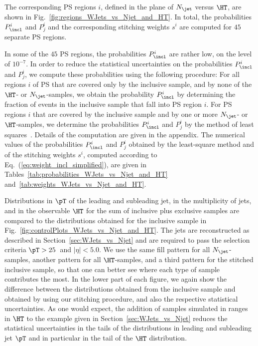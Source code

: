 The corresponding PS regions $i$, defined in the plane of $N_{\jet}$ versus $\HT$, are shown in Fig.~\ref{fig:regions_WJets_vs_Njet_and_HT}.
In total, the probabilities $P_{\incl}^{i}$ and $P_{j}^{i}$ and the corresponding stitching weights $s^{i}$ are computed for $45$ separate PS regions.

In some of the $45$ PS regions, the probabilities $P_{\incl}^{i}$ are rather low, on the level of $10^{-7}$.
In order to reduce the statistical uncertainties on the probabilities $P_{\incl}^{i}$ and $P_{j}^{i}$,
we compute these probabilities using the following procedure:
For all regions $i$ of PS that are covered only by the inclusive sample, and by none of the $\HT$- or $N_{\jet}$-samples,
we obtain the probability $P_{\incl}^{i}$ by determining the fraction of events in the inclusive sample that fall into PS region $i$.
For PS regions $i$ that are covered by the inclusive sample and by one or more $N_{\jet}$- or $\HT$-samples,
we determine the probabilities $P_{\incl}^{i}$ and $P_{j}^{i}$ by the method of least squares~\cite{Cowan:1998ji}.
Details of the computation are given in the appendix.
The numerical values of the probabilities $P_{\incl}^{i}$ and $P_{j}^{i}$ obtained by the least-square method
and of the stitching weights $s^{i}$, computed according to Eq.~(\ref{eq:weight_incl_simplified}), are given in Tables~\ref{tab:probabilities_WJets_vs_Njet_and_HT}
and~\ref{tab:weights_WJets_vs_Njet_and_HT}.

Distributions in $\pT$ of the leading and subleading jet,
in the multiplicity of jets, and in the observable $\HT$ 
for the sum of inclusive plus exclusive samples are compared to the distributions obtained for the inclusive sample in Fig.~\ref{fig:controlPlots_WJets_vs_Njet_and_HT}.
The jets are reconstructed as described in Section~\ref{sec:WJets_vs_Njet} and are required to pass the selection criteria $\pT > 25$~\GeV and $\vert\eta\vert < 5.0$.
We use the same fill pattern for all $N_{\jet}$-samples, another pattern for all $\HT$-samples, and a third pattern for the stitched inclusive sample,
so that one can better see where each type of sample contributes the most.
In the lower part of each figure, we again show the difference between the distributions obtained from the inclusive sample and obtained by using our stitching procedure,
and also the respective statistical uncertainties.
As one would expect, the addition of samples simulated in ranges in $\HT$ to the example given in Section~\ref{sec:WJets_vs_Njet}
reduces the statistical uncertainties in the tails of the distributions in leading and subleading jet $\pT$ and in particular in the tail of the $\HT$ distribution.


